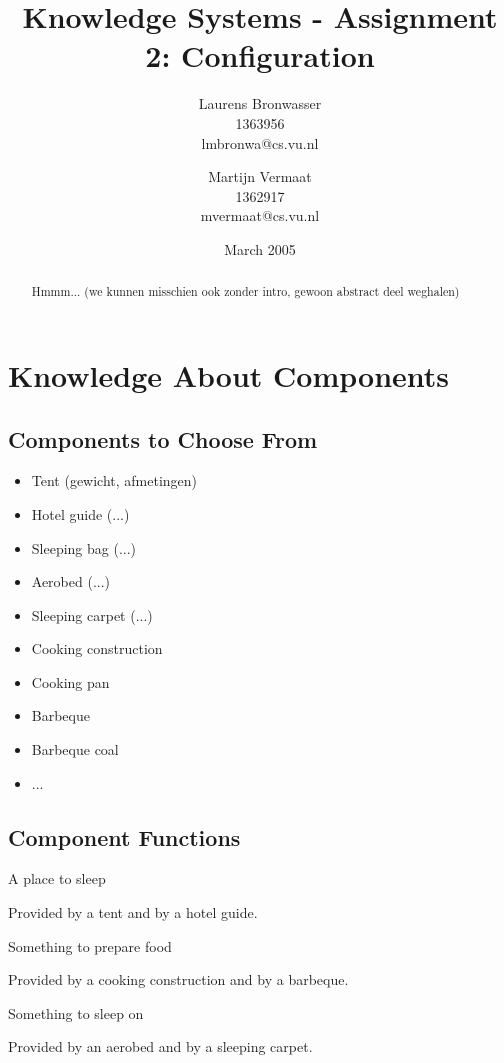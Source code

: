 \documentclass[a4paper,11pt]{article}
\title{Knowledge Systems - Assignment 2: Configuration}
\author{Laurens Bronwasser\\
1363956\\
lmbronwa@cs.vu.nl
\and
Martijn Vermaat\\
1362917\\
mvermaat@cs.vu.nl}
\date{March 2005}
\begin{document}
\maketitle


\renewcommand{\abstractname}{Introduction} %
\begin{abstract}
  Hmmm... (we kunnen misschien ook zonder intro, gewoon abstract
  deel weghalen)
\end{abstract}


\section*{Knowledge About Components}


\subsection*{Components to Choose From}

\begin{itemize}
\item Tent (gewicht, afmetingen)
\item Hotel guide (...)
\item Sleeping bag (...)
\item Aerobed (...)
\item Sleeping carpet (...)
\item Cooking construction
\item Cooking pan
\item Barbeque
\item Barbeque coal
\item ...
\end{itemize}


\subsection*{Component Functions}

\begin{description}

\item{A place to sleep}

Provided by a tent and by a hotel guide.

\item{Something to prepare food}

Provided by a cooking construction and by a barbeque.

\item{Something to sleep on}

Provided by an aerobed and by a sleeping carpet.

\end{description}
\end{document}
